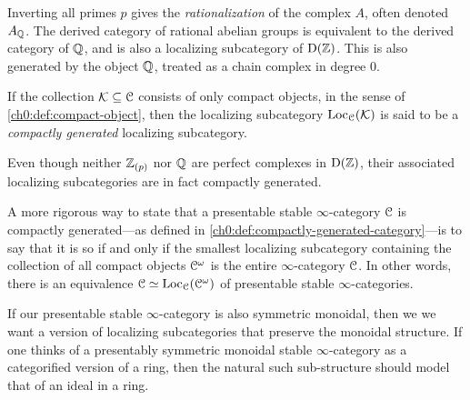 \begin{example}
    \label{ch0:ex:rational-ab}
    Inverting all primes $p$ gives the \emph{rationalization} of the complex $A$, often denoted $A_{\mathbb{Q}}$. The derived category of rational abelian groups is equivalent to the derived category of $\mathbb{Q}$, and is also a localizing subcategory of $\mathrm{D}(\mathbb{Z})$. This is also generated by the object $\mathbb{Q}$, treated as a chain complex in degree $0$. 
\end{example}


\begin{remark}
    \label{ch0:rm:compactly-generated-localizing-subcategory}
    If the collection $\mathcal{K} \subseteq \EuScript{C}$ consists of only compact objects, in the sense of \cref{ch0:def:compact-object}, then the localizing subcategory $\operatorname{Loc}_{\EuScript{C}}(\mathcal{K})$ is said to be a \emph{compactly generated} localizing subcategory. 
\end{remark}

\begin{example}
    Even though neither $\mathbb{Z}_{(p)}$ nor $\mathbb{Q}$ are perfect complexes in $\mathrm{D}(\mathbb{Z})$, their associated localizing subcategories are in fact compactly generated. 
\end{example}

\begin{remark}
    A more rigorous way to state that a presentable stable $\infty$-category $\EuScript{C}$ is compactly generated---as defined in \cref{ch0:def:compactly-generated-category}---is to say that it is so if and only if the smallest localizing subcategory containing the collection of all compact objects $\EuScript{C}^\omega$ is the entire $\infty$-category $\EuScript{C}$. In other words, there is an equivalence $\EuScript{C}\simeq \operatorname{Loc}_{\EuScript{C}}(\EuScript{C}^\omega)$ of presentable stable $\infty$-categories. 
\end{remark}

If our presentable stable $\infty$-category is also symmetric monoidal, then we we want a version of localizing subcategories that preserve the monoidal structure. If one thinks of a presentably symmetric monoidal stable $\infty$-category as a categorified version of a ring, then the natural such sub-structure should model that of an ideal in a ring. 

